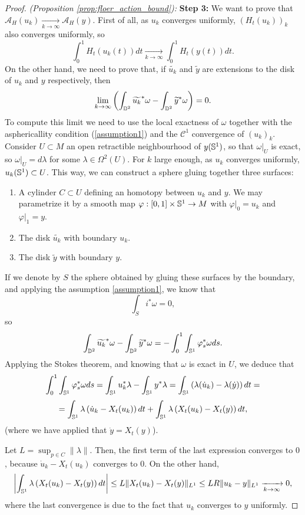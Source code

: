 \begin{proof} {\it (Proposition \ref{prop:floer_action_bound}):}
{\bf Step 3:} We want to prove that $\mathcal{A}_H(u_k) \xrightarrow[k\rightarrow\infty]{} \mathcal{A}_H(y)$. First of all, as $u_k$ converges uniformly, $(H_t(u_k))_k$ also converges uniformly, so
\[\int_0^1 H_t(u_k(t))dt \xrightarrow[k\rightarrow\infty]{} \int_0^1 H_t(y(t))dt .\]
On the other hand, we need to prove that, if $\widetilde{u_k}$ and $\widetilde{y}$ are extensions to the disk of $u_k$ and $y$ respectively, then
\[\lim_{k\rightarrow\infty} \left( \int_{\mathbb{D}^2} \widetilde{u_k}^{\ast} \omega - \int_{\mathbb{D}^2} \widetilde{y}^{\ast} \omega \right) = 0 .\]
To compute this limit we need to use the local exactness of $\omega$ together with the asphericallity condition (\ref{assumption1}) and the $\mathcal{C}^1$ convergence of $(u_k)_k$. Consider $U \subset M$ an open retractible neighbourhood of $y(\mathbb{S}^1)$, so that $\left.\omega\right|_U$ is exact, so $\left.\omega\right|_U = d\lambda$ for some $\lambda \in \Omega^2(U)$. For $k$ large enough, as $u_k$ converges uniformly, $u_k(\mathbb{S}^1) \subset U$. This way, we can construct a sphere gluing together three surfaces:
\begin{enumerate}
	\item A cylinder $C \subset U$ defining an homotopy between $u_k$ and $y$. We may parametrize it by a smooth map $\varphi : [0,1] \times \mathbb{S}^1 \rightarrow M$ with $\left.\varphi\right|_0 = u_k$ and $\left.\varphi\right|_1 = y$.
	\item The disk $\widetilde{u_k}$ with boundary $u_k$.
	\item The disk $\widetilde{y}$ with boundary $y$.
\end{enumerate}
If we denote by $S$ the sphere obtained by gluing these surfaces by the boundary, and applying the assumption \ref{assumption1}, we know that
\[\int_S i^{\ast} \omega = 0 ,\]
so
\[\int_{\mathbb{D}^2} \widetilde{u_k}^{\ast} \omega - \int_{\mathbb{D}^2} \widetilde{y}^{\ast} \omega = - \int_0^1 \int_{\mathbb{S}^1} \varphi_s^{\ast}\omega ds .\]
Applying the Stokes theorem, and knowing that $\omega$ is exact in $U$, we deduce that
\[\int_0^1 \int_{\mathbb{S}^1} \varphi_s^{\ast}\omega ds = \int_{\mathbb{S}^1} u_k^{\ast} \lambda - \int_{\mathbb{S}^1} y^{\ast} \lambda = \int_{\mathbb{S}^1} \left( \lambda(\dot{u}_k) - \lambda(\dot{y}) \right) dt =\]
\[= \int_{\mathbb{S}^1} \lambda\left( \dot{u}_k - X_t(u_k) \right) dt + \int_{\mathbb{S}^1} \lambda\left( X_t(u_k) - X_t(y) \right) dt ,\]
(where we have applied that $\dot{y} = X_t(y)$).

Let $L = \sup_{p \in C} \|\lambda\|$. Then, the first term of the last expression converges to $0$, because $\dot{u}_k - X_t(u_k)$ converges to $0$. On the other hand,
\[\left| \int_{\mathbb{S}^1}\lambda \left(X_t(u_k) - X_t(y)\right)dt \right| \leq L \|X_t(u_k) - X_t(y)\|_{L^1} \leq L R \|u_k - y\|_{L^1} \xrightarrow[k\rightarrow\infty]{} 0,\]
where the last convergence is due to the fact that $u_k$ converges to $y$ uniformly.
\end{proof}

